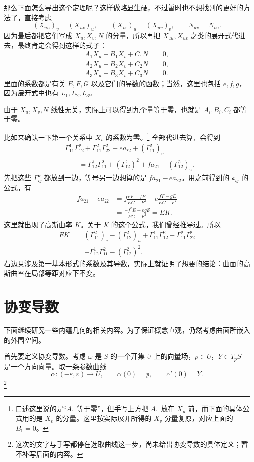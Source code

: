 \documentclass[UTF8,11pt,a4paper]{ctexart}
\begin{document}
那么下面怎么导出这个定理呢？这样做略显生硬，不过暂时也不想找别的更好的方法了，直接考虑
\[
(X_{uu})_v=(X_{uv})_u,\qquad
(X_{vv})_u=(X_{uv})_v,\qquad N_{uv}=N_{vu}.
\]
因为最后都把它们写成 $X_u,X_v,N$ 的分量，所以再把 $X_{uu},X_{uv}$ 之类的展开式代进去，最终肯定会得到这样的式子：
\[
\begin{aligned}
A_1X_u+B_1X_v+C_1N&=0,\\
A_2X_u+B_2X_v+C_2N&=0,\\
A_3X_u+B_3X_v+C_3N&=0.
\end{aligned}
\]
里面的系数都是有关 $E,F,G$ 以及它们的导数的函数；当然，这里也包括 $e,f,g$，因为展开式中也有 $L_1,L_2,L_3$。

由于 $X_u,X_v,N$ 线性无关，实际上可以得到九个量等于零，也就是 $A_i,B_i,C_i$ 都等于零。

比如来确认一下第一个关系中 $X_v$ 的系数为零。\footnote{口述这里说的是“$A_1$ 等于零”，但手写上方把 $A_1$ 放在 $X_u$ 前，而下面的具体公式用的是 $X_v$ 的分量。这里按实际展开所得的 $X_v$ 分量复原，对应上面的 $B_1=0$。}
全部代进去算，会得到
\[
\begin{aligned}
&\Gamma^1_{11}\Gamma^2_{12}
+\Gamma^2_{11}\Gamma^2_{22}+ea_{22}
+(\Gamma^2_{11})_v\\
&\qquad=\Gamma^1_{12}\Gamma^2_{11}
+(\Gamma^2_{12})^2+fa_{21}
+(\Gamma^2_{12})_u.
\end{aligned}
\]
先把这些 $\Gamma^k_{ij}$ 都放到一边，等号另一边想算的是 $fa_{21}-ea_{22}$。用之前得到的 $a_{ij}$ 的公式，有
\[
\begin{aligned}
fa_{21}-ea_{22}
&=f\frac{eF-fE}{EG-F^2}-e\frac{fF-gE}{EG-F^2}\\
&=\frac{-f^2E+egE}{EG-F^2}
=EK.
\end{aligned}
\]
这里就出现了高斯曲率 $K$。关于 $K$ 的这个公式，我们曾经推导过。所以
\[
\begin{aligned}
EK={}&(\Gamma^2_{11})_v-(\Gamma^2_{12})_u
+\Gamma^1_{11}\Gamma^2_{12}
+\Gamma^2_{11}\Gamma^2_{22}\\
&-\Gamma^1_{12}\Gamma^2_{11}-(\Gamma^2_{12})^2.
\end{aligned}
\]
右边只涉及第一基本形式的系数及其导数，实际上就证明了想要的结论：曲面的高斯曲率在局部等距对应下不变。

\section{协变导数}

下面继续研究一些内蕴几何的相关内容。为了保证概念直观，仍然考虑曲面所嵌入的外围空间。

首先要定义协变导数。考虑 $\omega$ 是 $S$ 的一个开集 $U$ 上的向量场，$p\in U$，$Y\in T_pS$ 是一个方向向量。取一条参数曲线
\[
\alpha\colon(-\varepsilon,\varepsilon)\longrightarrow U,
\qquad \alpha(0)=p,\qquad \alpha'(0)=Y.
\]\footnote{这次的文字与手写都停在选取曲线这一步，尚未给出协变导数的具体定义；暂不补写后面的内容。}
\end{document}
